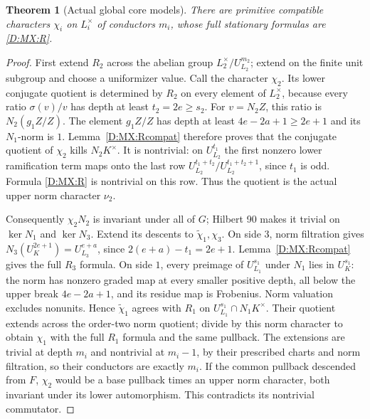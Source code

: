 \documentclass[11pt]{amsart}
\newtheorem{theorem}{Theorem}[section]
\theoremstyle{definition}
\theoremstyle{remark}
\begin{document}
\begin{theorem}[Actual global core models]\label{D:MX:cores}
There are primitive compatible characters $\chi_i$ on $L_i^\times$ of
conductors $m_i$, whose full stationary formulas are \eqref{D:MX:R}.
\end{theorem}
\begin{proof}
First extend $R_2$ across the abelian group $L_2^\times/U_{L_2}^{m_2}$;
extend on the finite unit subgroup and choose a uniformizer value.
Call the character $\chi_2$. Its lower conjugate quotient is determined
by $R_2$ on every element of $L_2^\times$, because every ratio
$\sigma(v)/v$ has depth at least $t_2=2e\ge s_2$.
For $v=N_2 Z$, this ratio is $N_2(g_1Z/Z)$.
The element $g_1Z/Z$ has depth at least $4e-2a+1\ge2e+1$ and its
$N_1$-norm is $1$. Lemma~\ref{D:MX:Rcompat} therefore proves that the conjugate
quotient of $\chi_2$ kills $N_2K^\times$.
It is nontrivial: on $U_{L_2}^{t_1}$ the first nonzero lower ramification
term maps onto the last row $U_{L_2}^{t_1+t_2}/U_{L_2}^{t_1+t_2+1}$,
since $t_1$ is odd. Formula \eqref{D:MX:R} is nontrivial on this row.
Thus the quotient is the actual upper norm character $\nu_2$.

Consequently $\chi_2N_2$ is invariant under all of $G$; Hilbert 90 makes
it trivial on $\ker N_1$ and $\ker N_3$. Extend its descents to
$\widetilde\chi_1,\chi_3$. On side $3$, norm filtration gives
$N_3(U_K^{2e+1})=U_{L_3}^{e+a}$, since
$2(e+a)-t_1=2e+1$. Lemma~\ref{D:MX:Rcompat} gives the full $R_3$ formula.
On side $1$, every preimage of $U_{L_1}^{s_1}$ under $N_1$ lies in
$U_K^{s_1}$: the norm has nonzero graded map at every smaller positive
depth, all below the upper break $4e-2a+1$, and its residue map is
Frobenius. Norm valuation excludes nonunits. Hence
$\widetilde\chi_1$ agrees with $R_1$ on
$U_{L_1}^{s_1}\cap N_1K^\times$. Their quotient extends across the order-two
norm quotient; divide by this norm character to obtain $\chi_1$ with the
full $R_1$ formula and the same pullback. The extensions are trivial at
depth $m_i$ and nontrivial at $m_i-1$, by their prescribed charts and norm
filtration, so their conductors are exactly $m_i$.
If the common pullback descended from $F$, $\chi_2$ would be a base
pullback times an upper norm character, both invariant under its lower
automorphism. This contradicts its nontrivial commutator.
\end{proof}
\end{document}
